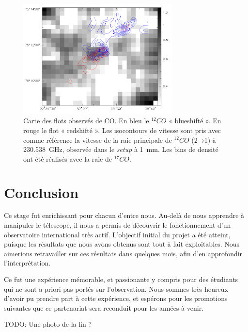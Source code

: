 \documentclass[a4paper,10pt,french]{article}
\newcommand{\setup}{\textit{setup}}
\newcommand{\unmm}{\SI{1}{\milli\meter}}
\begin{document}
\begin{figure}[ht]
    \centering
    \includegraphics[height=6cm]{mapC17O.png}
    \caption{
        Carte des flots observés de CO. En bleu le $^{12}CO$ « blueshifté ». En
        rouge le flot « redshifté ». Les isocontours de vitesse sont pris avec
        comme référence la vitesse de la raie principale de $^{12}CO$ (2→1) à
        \SI{230.538}{\giga\hertz}, observée dans le \setup{} à \unmm. Les bins
        de densité ont été réalisés avec la raie de $^{17}CO$.
    }
    \label{mapC17O}
\end{figure}

\section*{Conclusion}

Ce stage fut enrichissant pour chacun d’entre nous. Au-delà de nous apprendre à
manipuler le télescope, il nous a permis de découvrir le fonctionnement d’un
observatoire international très actif. L’objectif initial du projet a été
atteint, puisque les résultats que nous avons obtenus sont tout à fait
exploitables. Nous aimerions retravailler sur ces résultats dans quelques mois,
afin d’en approfondir l’interprétation.

Ce fut une expérience mémorable, et passionante y compris pour des étudiants
qui ne sont a priori pas portés sur l’observation. Nous sommes très heureux
d’avoir pu prendre part à cette expérience, et espérons pour les promotions
suivantes que ce partenariat sera reconduit pour les années à venir.

TODO: Une photo de la fin ?
\end{document}

